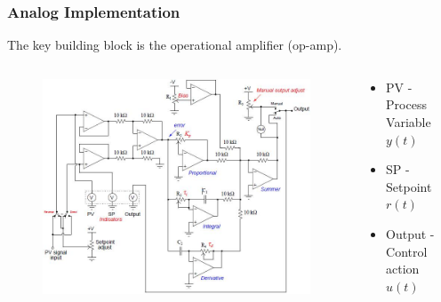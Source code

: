 \begin{frame}
	\frametitle{Analog Implementation}
	The key building block is the operational amplifier (op-amp).
	\begin{columns}
		\begin{column}{0.7 \textwidth}
			\begin{figure}
				\includegraphics[width=1\linewidth]{img/Principles_of_Feedback_Control_Fig_079}
			\end{figure}
		\end{column}
		\begin{column}{0.3 \textwidth}
			\tiny{
				\begin{itemize}
					\item PV - Process Variable $y(t)$
					\item SP - Setpoint $r(t)$
					\item Output - Control action $u(t)$
				\end{itemize}
			}
		\end{column}
	\end{columns}
\end{frame}

